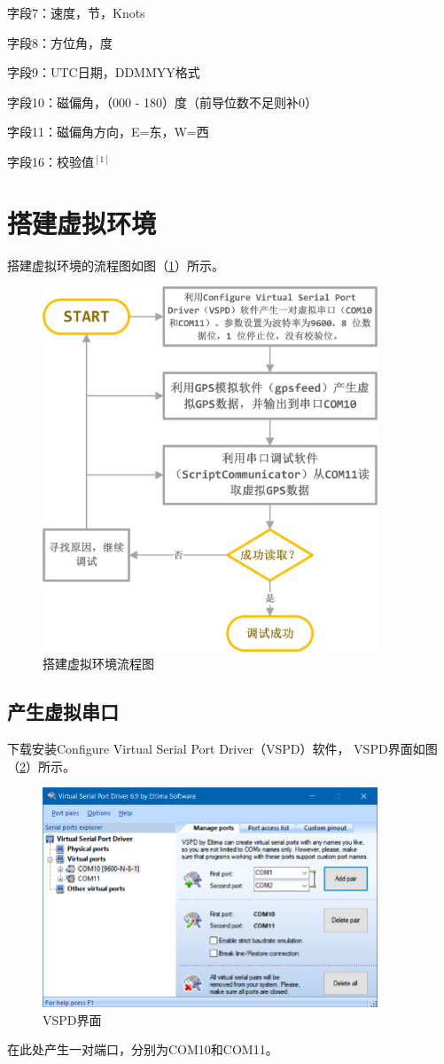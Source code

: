 \documentclass[UTF-8, a4paper, 12pt]{ctexart}
\begin{document}
字段7：速度，节，Knots

字段8：方位角，度

字段9：UTC日期，DDMMYY格式

字段10：磁偏角，（000 - 180）度（前导位数不足则补0）

字段11：磁偏角方向，E=东，W=西

字段16：校验值$\text{}^{[1]}$

\section{搭建虚拟环境}
搭建虚拟环境的流程图如图（\ref{f1}）所示。
\begin{figure}[htbp]
    \centering
    \includegraphics[width=10cm]{figs/f1.jpg}
    \caption{搭建虚拟环境流程图}
    \label{f1}
\end{figure}
\subsection{产生虚拟串口}

下载安装Configure Virtual Serial Port Driver（VSPD）软件，
VSPD界面如图（\ref{f2}）所示。
\begin{figure}[htbp]
    \centering
    \includegraphics[width=10cm]{figs/f2.png}
    \caption{VSPD界面}
    \label{f2}
\end{figure}
在此处产生一对端口，分别为COM10和COM11。
\end{document}

